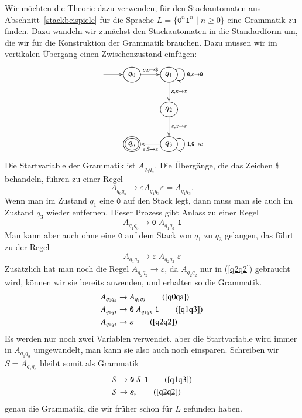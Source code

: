 \begin{beispiel}
Wir möchten die Theorie dazu verwenden, für den Stackautomaten aus
Abschnitt~\ref{stackbeispiele} für die Sprache
$L=\{\texttt{0}^n\texttt{1}^n\;|\; n\ge 0\}$ eine Grammatik zu finden.
Dazu wandeln wir zunächst den Stackautomaten in die Standardform um, die
wir für die Konstruktion der Grammatik brauchen.
Dazu müssen wir im vertikalen Übergang einen Zwischenzustand einfügen:
\[
\entrymodifiers={++[o][F]}
\xymatrix{
*+\txt{}\ar[r]
	&{q_0}\ar[r]^{\varepsilon,\varepsilon\to{\tt \$}}
		&{q_1} \ar@(ur,dr)^{{\tt 0},\varepsilon\to{\tt 0}}
		    \ar[d]^{\varepsilon,\varepsilon\to x}
\\
*+\txt{}
	&*+\txt{}
		&{q_2}\ar[d]^{\varepsilon,x\to\varepsilon}
\\
*+\txt{}
	&*++[o][F=]{q_a}
		&{q_3}\ar[l]^{\varepsilon,{\tt \$}\to\varepsilon}
		   \ar@(ur,dr)^{{\tt 1},{\tt 0}\to\varepsilon}
}
\]
Die Startvariable der Grammatik ist $A_{q_0q_a}$.
Die Übergänge, die
das Zeichen $\texttt{\$}$ behandeln, führen zu einer Regel
\begin{equation}
A_{q_0q_a}\to \varepsilon A_{q_1q_3}\varepsilon = A_{q_1q_3}.
\label{q0qa}
\end{equation}
Wenn man im Zustand $q_1$ eine $\texttt{0}$ auf den Stack legt, dann
muss man sie auch im Zustand $q_3$ wieder entfernen.
Dieser Prozess gibt Anlass zu einer Regel
\begin{equation}
A_{q_1q_3}\to \texttt{0}\; A_{q_1q_3}\;\texttt{1}
\label{q1q3}
\end{equation}
Man kann aber auch ohne eine $\texttt{0}$ auf dem Stack von
$q_1$ zu $q_3$ gelangen, das führt zu der Regel 
\begin{equation}
A_{q_1q_3}\to \varepsilon\; A_{q_2q_2}\;\varepsilon
\label{q2q2}
\end{equation}
Zusätzlich hat man noch die Regel $A_{q_2q_2}\to\varepsilon$, da 
$A_{q_2q_2}$ nur in (\ref{q2q2}) gebraucht wird, können wir sie
bereits anwenden, und erhalten so die Grammatik.
\begin{align}
A_{q_0q_a}&\to A_{q_1q_3} \tag{\ref{q0qa}}\\
A_{q_1q_3}&\to \texttt{0}\; A_{q_1q_3}\;\texttt{1} \tag{\ref{q1q3}}\\
A_{q_1q_3}&\to \varepsilon\tag{\ref{q2q2}}
\end{align}
Es werden nur noch zwei Variablen verwendet, aber die Startvariable
wird immer in $A_{q_1q_3}$ umgewandelt, man kann sie also auch noch
einsparen.
Schreiben wir $S=A_{q_1q_3}$ bleibt somit als Grammatik
\begin{align}
S&\to \texttt{0}\; S\; \texttt{1}\tag{\ref{q1q3}}\\
S&\to\varepsilon,\tag{\ref{q2q2}}
\end{align}
genau die Grammatik, die wir früher schon für $L$ gefunden haben.
\end{beispiel}

